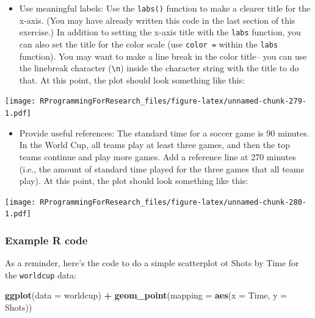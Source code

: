 \documentclass[]{book}
\makeatletter
\newenvironment{Shaded}{\begin{snugshade}}{\end{snugshade}}
\newcommand{\KeywordTok}[1]{\textcolor[rgb]{0.13,0.29,0.53}{\textbf{#1}}}
\newcommand{\DataTypeTok}[1]{\textcolor[rgb]{0.13,0.29,0.53}{#1}}
\newcommand{\StringTok}[1]{\textcolor[rgb]{0.31,0.60,0.02}{#1}}
\newcommand{\OperatorTok}[1]{\textcolor[rgb]{0.81,0.36,0.00}{\textbf{#1}}}
\newcommand{\NormalTok}[1]{#1}
\providecommand{\tightlist}{%
  \setlength{\itemsep}{0pt}\setlength{\parskip}{0pt}}
\newenvironment{kframe}{%
\medskip{}
\setlength{\fboxsep}{.8em}
 \def\at@end@of@kframe{}%
 \ifinner\ifhmode%
  \def\at@end@of@kframe{\end{minipage}}%
  \begin{minipage}{\columnwidth}%
 \fi\fi%
 \def\FrameCommand##1{\hskip\@totalleftmargin \hskip-\fboxsep
 \colorbox{shadecolor}{##1}\hskip-\fboxsep
     \hskip-\linewidth \hskip-\@totalleftmargin \hskip\columnwidth}%
 \MakeFramed {\advance\hsize-\width
   \@totalleftmargin\z@ \linewidth\hsize
   \@setminipage}}%
 {\par\unskip\endMakeFramed%
 \at@end@of@kframe}
\renewenvironment{Shaded}{\begin{kframe}}{\end{kframe}}
\theoremstyle{definition}
\theoremstyle{definition}
\theoremstyle{definition}
\theoremstyle{remark}
\makeatother
\begin{document}
\begin{itemize}
\tightlist
\item
  Use meaningful labels: Use the \texttt{labs()} function to make a
  clearer title for the x-axis. (You may have already written this code
  in the last section of this exercise.) In addition to setting the
  x-axis title with the \texttt{labs} function, you can also set the
  title for the color scale (use \texttt{color\ =} within the
  \texttt{labs} function). You may want to make a line break in the
  color title-- you can use the linebreak character
  (\texttt{\textbackslash{}n}) inside the character string with the
  title to do that. At this point, the plot should look something like
  this:
\end{itemize}

\texttt{[image: RProgrammingForResearch\_files/figure-latex/unnamed-chunk-279-1.pdf]}

\begin{itemize}
\tightlist
\item
  Provide useful references: The standard time for a soccer game is 90
  minutes. In the World Cup, all teams play at least three games, and
  then the top teams continue and play more games. Add a reference line
  at 270 minutes (i.e., the amount of standard time played for the three
  games that all teams play). At this point, the plot should look
  something like this:
\end{itemize}

\texttt{[image: RProgrammingForResearch\_files/figure-latex/unnamed-chunk-280-1.pdf]}

\subsubsection{Example R code}\label{example-r-code-7}

As a reminder, here's the code to do a simple scatterplot ot Shots by
Time for the \texttt{worldcup} data:

\begin{Shaded}
\begin{Highlighting}[]
\KeywordTok{ggplot}\NormalTok{(}\DataTypeTok{data =}\NormalTok{ worldcup) }\OperatorTok{+}
\StringTok{        }\KeywordTok{geom_point}\NormalTok{(}\DataTypeTok{mapping =} \KeywordTok{aes}\NormalTok{(}\DataTypeTok{x =}\NormalTok{ Time, }\DataTypeTok{y =}\NormalTok{ Shots))}
\end{Highlighting}
\end{Shaded}
\end{document}
